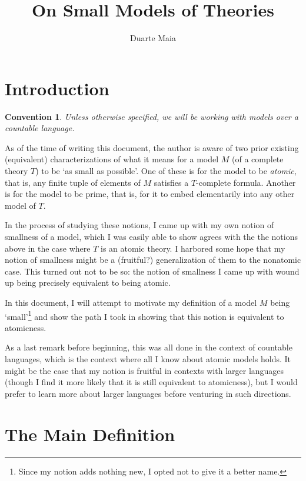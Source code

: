 \documentclass{article}
\title{On Small Models of Theories}
\author{Duarte Maia}
\theoremstyle{nonumberplain}
\newtheorem{convention}{Convention}
\begin{document}
\maketitle


\section{Introduction}

\begin{convention}
Unless otherwise specified, we will be working with models over a countable language.
\end{convention}

As of the time of writing this document, the author is aware of two prior existing (equivalent) characterizations of what it means for a model $M$ (of a complete theory $T$) to be `as small as possible'. One of these is for the model to be \emph{atomic}, that is, any finite tuple of elements of $M$ satisfies a $T$-complete formula. Another is for the model to be prime, that is, for it to embed elementarily into any other model of $T$.

In the process of studying these notions, I came up with my own notion of smallness of a model, which I was easily able to show agrees with the the notions above in the case where $T$ is an atomic theory. I harbored some hope that my notion of smallness might be a (fruitful?) generalization of them to the nonatomic case. This turned out not to be so: the notion of smallness I came up with wound up being precisely equivalent to being atomic.

In this document, I will attempt to motivate my definition of a model $M$ being `small'\footnote{Since my notion adds nothing new, I opted not to give it a better name.} and show the path I took in showing that this notion is equivalent to atomicness.

As a last remark before beginning, this was all done in the context of countable languages, which is the context where all I know about atomic models holds. It might be the case that my notion is fruitful in contexts with larger languages (though I find it more likely that it is still equivalent to atomicness), but I would prefer to learn more about larger languages before venturing in such directions.

\section{The Main Definition}
\end{document}
